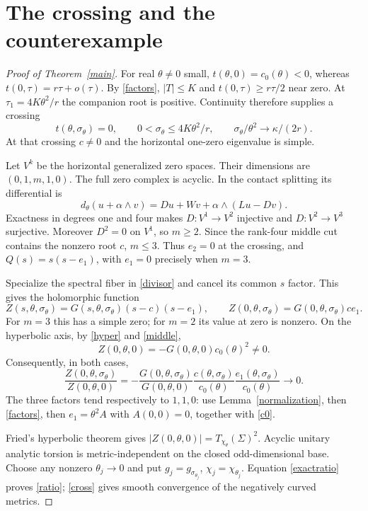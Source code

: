 \documentclass[11pt]{article}
\begin{document}
\section{The crossing and the counterexample}
\begin{proof}[Proof of Theorem~\ref{main}]
For real $\theta\ne0$ small, $t(\theta,0)=c_0(\theta)<0$, whereas
$t(0,\tau)=r\tau+o(\tau)$. By \eqref{factors}, $|T|\le K$ and
$t(0,\tau)\ge r\tau/2$ near zero. At $\tau_1=4K\theta^2/r$ the
companion root is positive. Continuity therefore supplies a crossing
\begin{equation}\label{cross}
 t(\theta,\sigma_\theta)=0,\qquad
 0<\sigma_\theta\le4K\theta^2/r,\qquad
 \sigma_\theta/\theta^2\longrightarrow\kappa/(2r).
\end{equation}
At that crossing $c\ne0$ and the horizontal one-zero eigenvalue is simple.

Let $V^k$ be the horizontal generalized zero spaces. Their dimensions
are $(0,1,m,1,0)$. The full zero complex is acyclic. In the contact
splitting its differential is
\[
 d_\theta(u+\alpha\wedge v)
       =Du+Wv+\alpha\wedge(Lu-Dv).
\]
Exactness in degrees one and four makes $D:V^1\to V^2$ injective
and $D:V^2\to V^3$ surjective. Moreover $D^2=0$ on $V^1$, so
$m\ge2$. Since the rank-four middle cut contains the nonzero root $c$,
$m\le3$. Thus $e_2=0$ at the crossing, and
$Q(s)=s(s-e_1)$, with $e_1=0$ precisely when $m=3$.

Specialize the spectral fiber in \eqref{divisor} and cancel its common
$s$ factor. This gives the holomorphic function
\begin{equation}\label{crossvalue}
 Z(s,\theta,\sigma_\theta)
   =G(s,\theta,\sigma_\theta)(s-c)(s-e_1),\qquad
 Z(0,\theta,\sigma_\theta)=G(0,\theta,\sigma_\theta)c e_1.
\end{equation}
For $m=3$ this has a simple zero; for $m=2$ its value at zero is nonzero.
On the hyperbolic axis, by \eqref{hyper} and \eqref{middle},
\[
 Z(0,\theta,0)=-G(0,\theta,0)c_0(\theta)^2\ne0.
\]
Consequently, in both cases,
\begin{equation}\label{exactratio}
 \frac{Z(0,\theta,\sigma_\theta)}{Z(0,\theta,0)}
 =-\frac{G(0,\theta,\sigma_\theta)}{G(0,\theta,0)}
     \frac{c(\theta,\sigma_\theta)}{c_0(\theta)}
     \frac{e_1(\theta,\sigma_\theta)}{c_0(\theta)}
 \longrightarrow0.
\end{equation}
The three factors tend respectively to $1,1,0$: use
Lemma~\ref{normalization}, then \eqref{factors}, then
$e_1=\theta^2A$ with $A(0,0)=0$, together with \eqref{c0}.

Fried's hyperbolic theorem \cite{Fried} gives
$|Z(0,\theta,0)|=T_{\chi_\theta}(\Sigma)^2$.
Acyclic unitary analytic torsion is metric-independent on the closed
odd-dimensional base. Choose any nonzero $\theta_j\to0$ and put
$g_j=g_{\sigma_{\theta_j}}$, $\chi_j=\chi_{\theta_j}$.
Equation \eqref{exactratio} proves \eqref{ratio}; \eqref{cross} gives
smooth convergence of the negatively curved metrics.
\end{proof}
\end{document}
